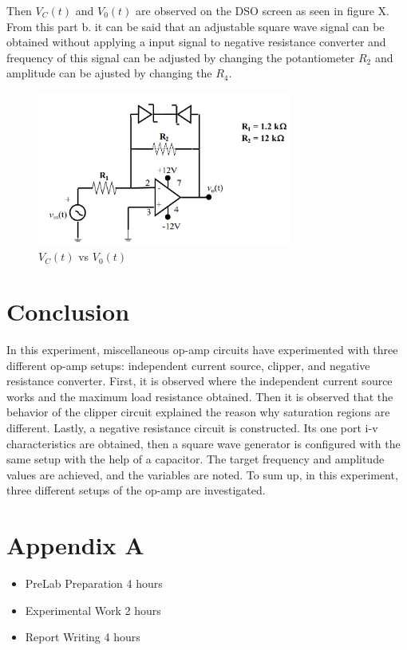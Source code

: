 \documentclass[letterpaper,12pt]{article}
\begin{document}
Then \(V_C(t)\) and \(V_0(t)\) are observed on the DSO screen as seen in figure X.
From this part b. it can be said that an adjustable square wave signal can be obtained without applying a input signal to negative resistance converter and frequency of this signal can be adjusted by changing the potantiometer \(R_2\) and amplitude can be ajusted by changing the \(R_4\).
\begin{figure}[H]
    \centering
    \includegraphics[width = 0.75\textwidth]{2SCH.png}
    \caption{\(V_C(t)\) vs \(V_0(t)\)}
\end{figure} 


\section{Conclusion}
In this experiment, miscellaneous op-amp circuits have experimented with three different op-amp setups: independent current source, clipper, and negative resistance converter. First, it is observed where the independent current source works and the maximum load resistance obtained. Then it is observed that the behavior of the clipper circuit explained the reason why saturation regions are different. Lastly, a negative resistance circuit is constructed. Its one port i-v characteristics are obtained, then a square wave generator is configured with the same setup with the help of a capacitor. The target frequency and amplitude values are achieved, and the variables are noted. To sum up, in this experiment, three different setups of the op-amp are investigated.
\section*{Appendix A}
\begin{itemize}
    \item PreLab Preparation 4 hours
    \item Experimental Work 2  hours
    \item Report Writing 4 hours
\end{itemize}
\end{document}
